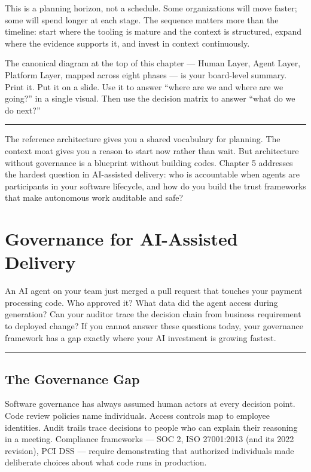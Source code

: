 \documentclass[
  a4paper,
  DIV=11,
  numbers=noendperiod]{scrreprt}
\begin{document}
This is a planning horizon, not a schedule. Some organizations will move
faster; some will spend longer at each stage. The sequence matters more
than the timeline: start where the tooling is mature and the context is
structured, expand where the evidence supports it, and invest in context
continuously.

The canonical diagram at the top of this chapter --- Human Layer, Agent
Layer, Platform Layer, mapped across eight phases --- is your
board-level summary. Print it. Put it on a slide. Use it to answer
``where are we and where are we going?'' in a single visual. Then use
the decision matrix to answer ``what do we do next?''

\begin{center}\rule{0.5\linewidth}{0.5pt}\end{center}

The reference architecture gives you a shared vocabulary for planning.
The context moat gives you a reason to start now rather than wait. But
architecture without governance is a blueprint without building codes.
Chapter 5 addresses the hardest question in AI-assisted delivery: who is
accountable when agents are participants in your software lifecycle, and
how do you build the trust frameworks that make autonomous work
auditable and safe?

\chapter{Governance for AI-Assisted
Delivery}\label{governance-for-ai-assisted-delivery}

An AI agent on your team just merged a pull request that touches your
payment processing code. Who approved it? What data did the agent access
during generation? Can your auditor trace the decision chain from
business requirement to deployed change? If you cannot answer these
questions today, your governance framework has a gap exactly where your
AI investment is growing fastest.

\begin{center}\rule{0.5\linewidth}{0.5pt}\end{center}

\section{The Governance Gap}\label{the-governance-gap}

Software governance has always assumed human actors at every decision
point. Code review policies name individuals. Access controls map to
employee identities. Audit trails trace decisions to people who can
explain their reasoning in a meeting. Compliance frameworks --- SOC 2,
ISO 27001:2013 (and its 2022 revision), PCI DSS --- require
demonstrating that authorized individuals made deliberate choices about
what code runs in production.
\end{document}
